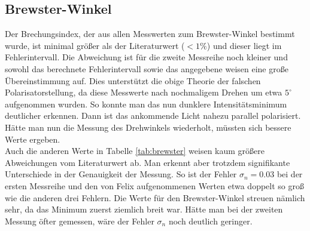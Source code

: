 \documentclass[12pt,a4paper,titlepage,headinclude,bibtotoc]{scrartcl}
\begin{document}
\subsection{Brewster-Winkel}
Der Brechungsindex, der aus allen Messwerten zum Brewster-Winkel bestimmt wurde, ist minimal größer als der Literaturwert ($< 1\%$) und dieser liegt im Fehlerintervall.
Die Abweichung ist für die zweite Messreihe noch kleiner und sowohl das berechnete Fehlerintervall sowie das angegebene weisen eine große Übereinstimmung auf.
Dies unterstützt die obige Theorie der falschen Polarisatorstellung, da diese Messwerte nach nochmaligem Drehen um etwa $5^\circ$ aufgenommen wurden.
So konnte man das nun dunklere Intensitätsminimum deutlicher erkennen.
Dann ist das ankommende Licht nahezu parallel polarisiert.
Hätte man nun die Messung des Drehwinkels wiederholt, müssten sich bessere Werte ergeben.\\

Auch die anderen Werte in Tabelle \ref{tab:brewster} weisen kaum größere Abweichungen vom Literaturwert ab.
Man erkennt aber trotzdem signifikante Unterschiede in der Genauigkeit der Messung.
So ist der Fehler $\sigma_n=0.03$ bei der ersten Messreihe und den von Felix aufgenommenen Werten etwa doppelt so groß wie die anderen drei Fehlern.
Die Werte für den Brewster-Winkel streuen nämlich sehr, da das Minimum zuerst ziemlich breit war.
Hätte man bei der zweiten Messung öfter gemessen, wäre der Fehler $\sigma_n$ noch deutlich geringer.



\end{document}
